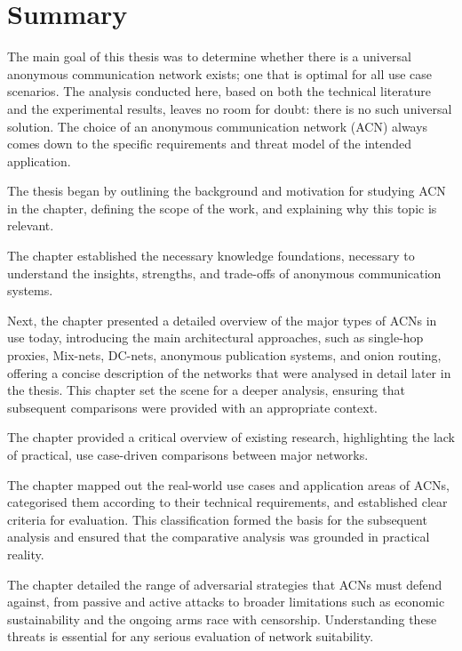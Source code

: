\chapter{Summary}
\label{chap:Summary}
The main goal of this thesis was to determine whether there is a universal anonymous communication network exists; one that is optimal for all use case scenarios. The analysis conducted here, based on both the technical literature and the experimental results, leaves no room for doubt: there is no such universal solution. The choice of an anonymous communication network (ACN) always comes down to the specific requirements and threat model of the intended application.

The thesis began by outlining the background and motivation for studying ACN in the  chapter, defining the scope of the work, and explaining why this topic is relevant. 

The  chapter established the necessary knowledge foundations, necessary to understand the insights, strengths, and trade-offs of anonymous communication systems.

Next, the  chapter presented a detailed overview of the major types of ACNs in use today, introducing the main architectural approaches, such as single-hop proxies, Mix-nets, DC-nets, anonymous publication systems, and onion routing, offering a concise description of the networks that were analysed in detail later in the thesis. This chapter set the scene for a deeper analysis, ensuring that subsequent comparisons were provided with an appropriate context.

The  chapter provided a critical overview of existing research, highlighting the lack of practical, use case-driven comparisons between major networks.

The chapter  mapped out the real-world use cases and application areas of ACNs, categorised them according to their technical requirements, and established clear criteria for evaluation. This classification formed the basis for the subsequent analysis and ensured that the comparative analysis was grounded in practical reality.

The  chapter detailed the range of adversarial strategies that ACNs must defend against, from passive and active attacks to broader limitations such as economic sustainability and the ongoing arms race with censorship. Understanding these threats is essential for any serious evaluation of network suitability.

